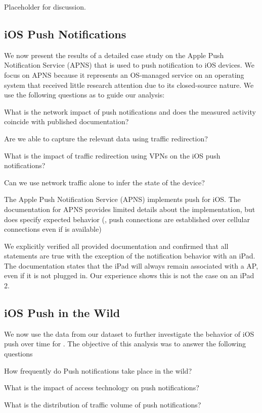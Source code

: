 Placeholder for discussion.

\subsection{iOS Push Notifications}

We now present the results of a detailed case study on the Apple Push Notification Service (APNS) that is used to push notification to iOS devices. 
We focus on APNS because it represents an OS-managed service on an operating system that received little research attention due to its closed-source nature. 
We use the following questions as to guide our analysis: 
\begin{packedenumerate}
\item What is the network impact of push notifications and does the measured activity coincide with published documentation? 
\item Are we able to capture the relevant data using traffic redirection?
\item What is the impact of traffic redirection using VPNs on the iOS push notifications? 
\item Can we use network traffic alone to infer the state of the device?
\end{packedenumerate}

The Apple Push Notification Service (APNS) implements push for iOS. 
The documentation for APNS provides limited details about the implementation, but does specify expected behavior (\eg, push
connections are established over cellular connections even if \wifi is available)

We explicitly verified all provided documentation and confirmed that all statements are true with the exception of the notification behavior with an iPad. 
The documentation states that the iPad will always remain associated with a \wifi AP, even if it is not plugged in. Our
experience shows this is not the case on an iPad 2.


\subsection{iOS Push in the Wild}

We now use the data from our \moball dataset to further investigate the behavior of iOS push over time for . 
The objective of this analysis was to answer the following questions
\begin{packedenumerate}
\item How frequently do Push notifications take place in the wild?
\item What is the impact of access technology on push notifications?
\item What is the distribution of traffic volume of push notifications?	
\item {}
\item {}
\end{packedenumerate}

